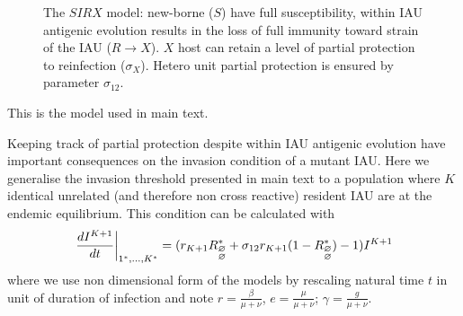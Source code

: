 \begin{figure}[H]
\center
  \caption{The $SIRX$ model: new-borne ($S$) have full susceptibility,
    within IAU antigenic evolution results in the loss of full
    immunity toward strain of the IAU ($R \to X$). $X$ host can
    retain a level of partial protection to reinfection
    ($\sigma_X$). Hetero unit partial protection is ensured by
    parameter $\sigma_{12}$.}
\label{fig:sirx}
\end{figure}

This is the model used in main text.

Keeping track of partial protection despite within IAU antigenic
evolution have important consequences on the invasion condition of a
mutant IAU. Here we generalise the invasion threshold presented in
main text to a population where $K$ identical unrelated (and therefore
non cross reactive) resident IAU are at the endemic equilibrium. This
condition can be calculated with
 $$\left. \frac{d I^{K+1}}{d t} \right|_{1^*,\dots, K^*} =
(r_{K+1} R_{\begin{subarray}{l}\varnothing \\
    \varnothing \end{subarray}}^* + \sigma_{12} r_{K+1}
(1-R_{\begin{subarray}{l}\varnothing \\ \varnothing \end{subarray}}^*)
-1) I^{K+1}$$
where we use non dimensional form of the models by
rescaling natural time $t$ in unit of duration of infection and note
$r=\frac{\beta}{\mu+\nu}$, $e=\frac{\mu}{\mu+\nu}$;
$\gamma=\frac{g}{\mu+\nu}$.

